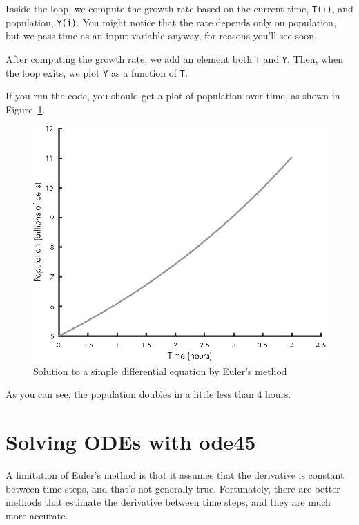 Inside the loop, we compute the growth rate based on the current time, \lstinline{T(i)}, and population, \lstinline{Y(i)}.  You might notice that the rate depends only on population, but we pass time as an input variable anyway, for reasons you'll see soon.

After computing the growth rate, we add an element both \lstinline{T} and \lstinline{Y}.  Then, when the loop exits, we plot \lstinline{Y} as a function of \lstinline{T}.

If you run the code, you should get a plot of population over time, as shown in Figure~\ref{fig:euler}.

\begin{figure}[ht]
\centerline{\includegraphics[scale=0.8]{images/figure09_01_new.eps}}
\caption{Solution to a simple differential equation by Euler's method}
\label{fig:euler}
\end{figure}

As you can see, the population doubles in a little less than 4 hours.


\section{Solving ODEs with ode45}
\label{ode45}

A limitation of Euler's method is that it assumes that the derivative is constant between time steps, and that's not generally true.  Fortunately, there are better methods that estimate the derivative between time steps, and  they are much more accurate.

